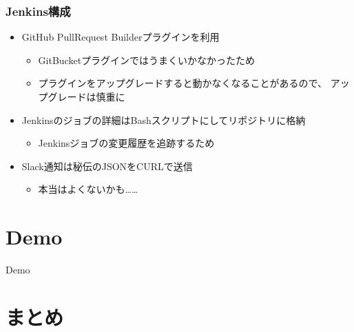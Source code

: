 \begin{frame}
  \frametitle{Jenkins構成}
  
  \begin{itemize}
    \item<1-> GitHub PullRequest Builderプラグインを利用
    \begin{itemize}
      \item GitBucketプラグインではうまくいかなかったため
      \item プラグインをアップグレードすると動かなくなることがあるので、
      アップグレードは慎重に
    \end{itemize}

    \item<2-> Jenkinsのジョブの詳細はBashスクリプトにしてリポジトリに格納
    \begin{itemize}
      \item Jenkinsジョブの変更履歴を追跡するため
    \end{itemize}

    \item<3-> Slack通知は秘伝のJSONをCURLで送信
    \begin{itemize}
      \item 本当はよくないかも……
    \end{itemize}
  \end{itemize}
\end{frame}

\section{Demo}

\begin{frame}
  \centering
  {\huge Demo}
\end{frame}

\section{まとめ}


